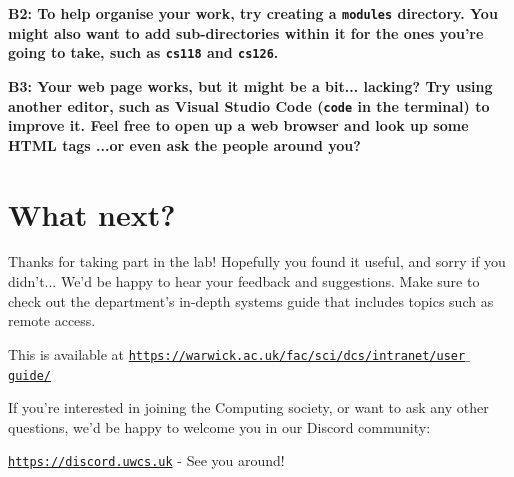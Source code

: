 \documentclass[a4paper,11pt,parskip=half-]{scrartcl}
\begin{document}
\bfseries B2: \normalfont 
To help organise your work, try creating a \texttt{modules} directory. 
You might also want to add sub-directories within it for the ones you're going to take, such as \texttt{cs118} and \texttt{cs126}.

\bfseries B3: \normalfont 
Your web page works, but it might be a bit... lacking? 
Try using another editor, such as Visual Studio Code (\texttt{code} in the terminal) to improve it. 
Feel free to open up a web browser and look up some HTML tags ...or even ask the people around you?

\section*{What next?}

Thanks for taking part in the lab! Hopefully you found it useful, and sorry if you didn't... 
We'd be happy to hear your feedback and suggestions.
Make sure to check out the department's in-depth systems guide that includes topics such as remote access.

This is available at \href{https://warwick.ac.uk/fac/sci/dcs/intranet/user_guide/}{\texttt{https://warwick.ac.uk/fac/sci/dcs/intranet/user$\_$guide/}}

If you're interested in joining the Computing society, or want to ask any other questions, we'd be happy to welcome you in our Discord community:

\href{https://discord.uwcs.uk}{\texttt{https://discord.uwcs.uk}} - See you around!
\end{document}

